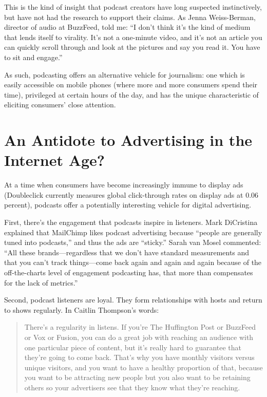 \documentclass[notoc, symmetric, nobib, nols]{towcenter-guideto-book}
\begin{document}
This is the kind of insight that podcast creators have long suspected instinctively, but have not had the research to support their claims. As Jenna Weiss-Berman, director of audio at BuzzFeed, told me: ``I don't think it's the kind of medium that lends itself to virality. It's not a one-minute video, and it's not an article you can quickly scroll through and look at the pictures and say you read it. You have to sit and engage.''\autocite{wb}

As such, podcasting offers an alternative vehicle for journalism: one which is easily accessible on mobile phones (where more and more consumers spend their time), privileged at certain hours of the day, and has the unique characteristic of eliciting consumers' close attention. 


\section{An Antidote to Advertising in the Internet Age?} 
At a time when consumers have become increasingly immune to display ads (Doubleclick currently measures global click-through rates on display ads at 0.06 percent), podcasts offer a potentially interesting vehicle for digital advertising.\autocite{ctr}

First, there's the engagement that podcasts inspire in listeners. Mark DiCristina explained that MailChimp likes podcast advertising because ``people are generally tuned into podcasts,'' and thus the ads are ``sticky.''\autocite{mailchimp} Sarah van Mosel commented: ``All these brands---regardless that we don't have standard measurements and that you can't track things---come back again and again and again because of the off-the-charts level of engagement podcasting has, that more than compensates for the lack of metrics.''\autocite{mosel}

Second, podcast listeners are loyal. They form relationships with hosts and return to shows regularly. In Caitlin Thompson's words: 

\begin{quote}
There's a regularity in listens. If you're The Huffington Post or BuzzFeed or Vox or Fusion, you can do a great job with reaching an audience with one particular piece of content, but it's really hard to guarantee that they're going to come back. That's why you have monthly visitors versus unique visitors, and you want to have a healthy proportion of that, because you want to be attracting new people but you also want to be retaining others so your advertisers see that they know what they're reaching.\autocite{thompson} 
\end{quote}
\end{document}
